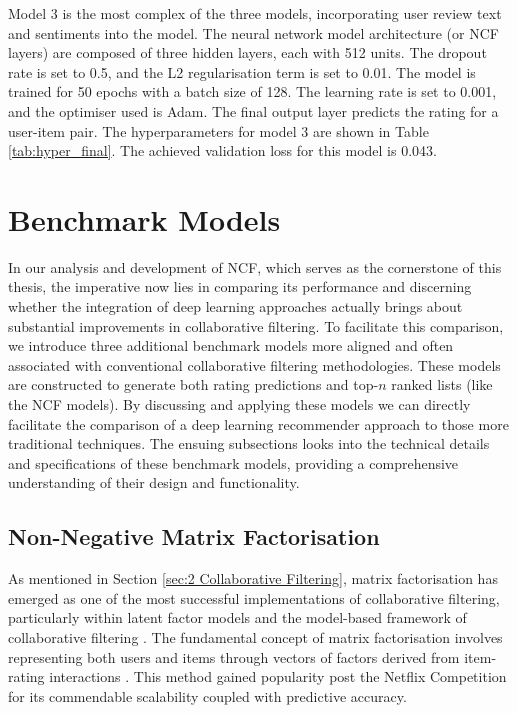 Model 3 is the most complex of the three models, incorporating user review text and sentiments into the model. The neural network model architecture (or NCF layers) are composed of three hidden layers, each with 512 units. The dropout rate is set to 0.5, and the L2 regularisation term is set to 0.01. The model is trained for 50 epochs with a batch size of 128. The learning rate is set to 0.001, and the optimiser used is Adam. The final output layer predicts the rating for a user-item pair. The hyperparameters for model 3 are shown in Table \ref{tab:hyper_final}. The achieved validation loss for this model is 0.043.


\section{Benchmark Models}
\label{sec:4 Benchmark Models}

In our analysis and development of NCF, which serves as the cornerstone of this thesis, the imperative now lies in comparing its performance and discerning whether the integration of deep learning approaches actually brings about substantial improvements in collaborative filtering. To facilitate this comparison, we introduce three additional benchmark models more aligned and often associated with conventional collaborative filtering methodologies. These models are constructed to generate both rating predictions and top-$n$ ranked lists (like the NCF models). By discussing and applying these models we can directly facilitate the comparison of a deep learning recommender approach to those more traditional techniques. The ensuing subsections looks into the technical details and specifications of these benchmark models, providing a comprehensive understanding of their design and functionality.


\subsection{Non-Negative Matrix Factorisation}
\label{subsec:4 Non-Negative Matrix Factorisation}

As mentioned in Section \ref{sec:2 Collaborative Filtering}, matrix factorisation has emerged as one of the most successful implementations of collaborative filtering, particularly within latent factor models and the model-based framework of collaborative filtering \cite{koren2009collaborative}. The fundamental concept of matrix factorisation involves representing both users and items through vectors of factors derived from item-rating interactions \cite{koren2009collaborative}. This method gained popularity post the Netflix Competition for its commendable scalability coupled with predictive accuracy. 

